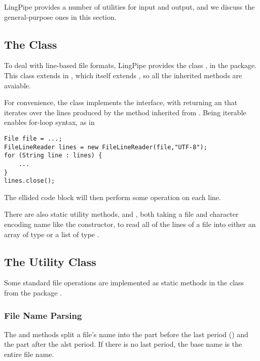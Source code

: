 LingPipe provides a number of utilities for input and output,
and we discuss the general-purpose ones in this section.  

\subsection{The  Class}

To deal with line-based file formats, LingPipe provides the class
, in the  package.  This
class extends  in , which itself
extends , so all the inherited methods are
avaiable.  

For convenience, the  class implements the
 interface, with  returning an
 that iterates over the lines produced by the
 method inherited from .  Being
iterable enables for-loop syntax, as in
%
\begin{verbatim}
File file = ...;
FileLineReader lines = new FileLineReader(file,"UTF-8");
for (String line : lines) {
    ...
}
lines.close();
\end{verbatim}
%
The ellided code block will then perform some operation on each line.

There are also static utility methods,  and
, both taking a file and character encoding
name like the constructor, to read all of the lines of a file into
either an array of type  or a list of type
.

\subsection{The  Utility Class}

Some standard file operations are implemented as static methods
in the  class from the package .

\subsubsection{File Name Parsing}

The  and  methods split a
file's name into the part before the last period () and the
part after the alst period.  If there is no last period, the base name
is the entire file name.

